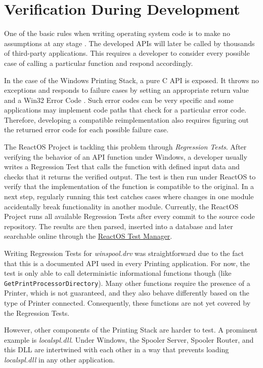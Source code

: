 \section{Verification During Development}
One of the basic rules when writing operating system code is to make no assumptions at any stage \cite{ionescu2007reactos}.
The developed \glspl{API} will later be called by thousands of third-party applications.
This requires a developer to consider every possible case of calling a particular function and respond accordingly.

In the case of the Windows Printing Stack, a pure C \gls{API} is exposed.
It throws no exceptions and responds to failure cases by setting an appropriate return value and a Win32 Error Code \cite{msdn2015setlasterror}.
Such error codes can be very specific and some applications may implement code paths that check for a particular error code.
Therefore, developing a compatible reimplementation also requires figuring out the returned error code for each possible failure case.

The ReactOS Project is tackling this problem through \emph{Regression Tests}.
After verifying the behavior of an \gls{API} function under Windows, a developer usually writes a Regression Test that calls the function with defined input data and checks that it returns the verified output.
The test is then run under ReactOS to verify that the implementation of the function is compatible to the original.
In a next step, regularly running this test catches cases where changes in one module accidentally break functionality in another module.
Currently, the ReactOS Project runs all available Regression Tests after every commit to the source code repository.
The results are then parsed, inserted into a database and later searchable online through the \href{https://reactos.org/testman}{ReactOS Test Manager}.

Writing Regression Tests for \emph{winspool.drv} was straightforward due to the fact that this is a documented \gls{API} used in every Printing application.
For now, the test is only able to call deterministic informational functions though (like \texttt{GetPrint\-Processor\-Directory}).
Many other functions require the presence of a Printer, which is not guaranteed, and they also behave differently based on the type of Printer connected.
Consequently, these functions are not yet covered by the Regression Tests.

However, other components of the Printing Stack are harder to test.
A prominent example is \emph{localspl.dll}.
Under Windows, the Spooler Server, Spooler Router, and this \gls{DLL} are intertwined with each other in a way that prevents loading \emph{localspl.dll} in any other application.

